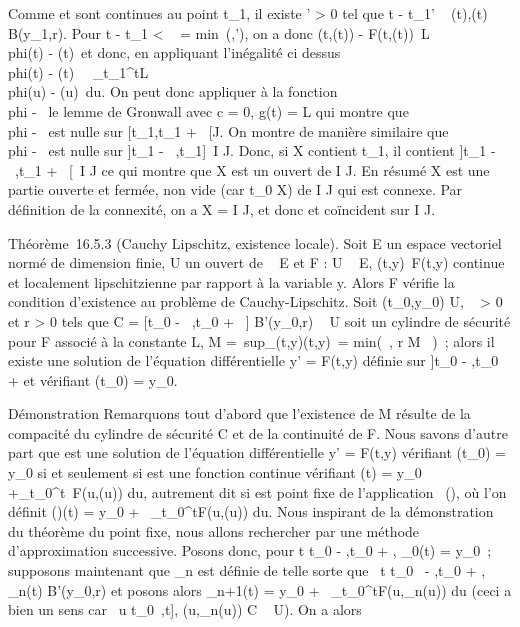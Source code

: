 Comme \phi et \psi sont continues au point t_1, il existe \eta'
\textgreater{} 0 tel que t - t_1\leq \eta' \rigtharrow~
\phi(t),\psi(t) \in B(y_1,r). Pour t - t_1
\textless{} \alpha~ = min~(\eta,\eta'), on a donc
\F(t,\phi(t)) -
F(t,\psi(t))\ \leq L\\phi(t) -
\psi(t)\, et donc, en appliquant l'inégalité ci
dessus \\phi(t) - \psi(t)\
\leq\int ~
_t_1^tL\\phi(u) -
\psi(u)\ du. On peut donc appliquer à la fonction
\\phi - \psi\ le lemme de
Gronwall avec c = 0, g(t) = L qui montre que \\phi
- \psi\ est nulle sur {[}t_1,t_1
+ \alpha~{[}\bigcapI \bigcap J. On montre de manière similaire que
\\phi - \psi\ est nulle sur
{]}t_1 - \alpha~,t_1{]}\, \bigcap I \bigcap J. Donc, si X
contient t_1, il contient {]}t_1 - \alpha~,t_1 +
\alpha~{[}\, \bigcap I \bigcap J ce qui montre que X est un ouvert de I \bigcap
J. En résumé X est une partie ouverte et fermée, non vide (car
t_0 \in X) de I \bigcap J qui est connexe. Par définition de la
connexité, on a X = I \bigcap J, et donc \phi et \psi coïncident sur I \bigcap J.

Théorème~16.5.3 (Cauchy Lipschitz, existence locale). Soit E un espace
vectoriel normé de dimension finie, U un ouvert de \mathbb{R}~ \times E et F : U \rightarrow~ E,
(t,y)\mapsto~F(t,y) continue et localement
lipschitzienne par rapport à la variable y. Alors F vérifie la condition
d'existence au problème de Cauchy-Lipschitz. Soit
(t_0,y_0) \in U, \alpha~ \textgreater{} 0 et r \textgreater{}
0 tels que C = {[}t_0 - \alpha~,t_0 + \alpha~{]} \times
B'(y_0,r) \subset~ U soit un cylindre de sécurité pour F associé à la
constante L, M =\
sup_(t,y)\inC\F(t,y)\,
\eta = min(\alpha~, r \over M~ )~;
alors il existe une solution \phi de l'équation différentielle y' = F(t,y)
définie sur {]}t_0 - \eta,t_0 + \eta{[} et vérifiant
\phi(t_0) = y_0.

Démonstration Remarquons tout d'abord que l'existence de M résulte de la
compacité du cylindre de sécurité C et de la continuité de F. Nous
savons d'autre part que \phi est une solution de l'équation différentielle
y' = F(t,y) vérifiant \phi(t_0) = y_0 si et seulement si
\phi est une fonction continue vérifiant \phi(t) = y_0
+\int  _t_0^t~F(u,\phi(u))
du, autrement dit si \phi est point fixe de l'application
\psi\mapsto~\Gamma(\psi), où l'on définit \Gamma(\psi)(t) =
y_0 +\int ~
_t_0^tF(u,\psi(u)) du. Nous inspirant de la
démonstration du théorème du point fixe, nous allons rechercher \phi par
une méthode d'approximation successive. Posons donc, pour t
\in{]}t_0 - \eta,t_0 + \eta{[}, \phi_0(t) =
y_0~; supposons maintenant que \phi_n est définie de
telle sorte que \forall~t \in{]}t_0~ -
\eta,t_0 + \eta{[}, \phi_n(t) \in B'(y_0,r) et posons
alors \phi_n+1(t) = y_0 +\int ~
_t_0^tF(u,\phi_n(u)) du (ceci a bien un
sens car \forall~u \in {[}t_0~,t{]},
(u,\phi_n(u)) \in C \subset~ U). On a alors

